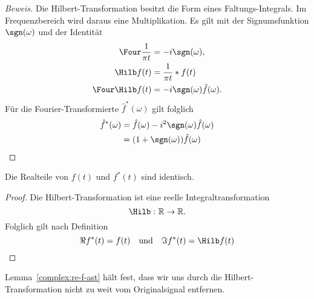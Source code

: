 \begin{proof}[Beweis]
	
	Die Hilbert-Transformation besitzt die Form eines Faltungs-Integrals.
	Im Frequenzbereich wird daraus eine Multiplikation.
	Es gilt mit der Signumsfunktion $\sgn(\omega)$ und der Identität
	\begin{align*}
		\Four \frac{1}{\pi t}  &= -i\sgn(\omega), \\
		\Hilb f(t) &= \frac{1}{\pi t} * f(t)\\
		\Four\Hilb f(t) &= -i\sgn(\omega) \hat{f}(\omega).
	\end{align*}
	Für die Fourier-Transformierte $\hat f^\ast(\omega)$ gilt folglich 
	\begin{align*}
		\hat{f}^\ast(\omega) 
		&= \hat{f}(\omega) - i^2\sgn(\omega)\hat{f}(\omega)\\
		&= (1 +\sgn(\omega))\hat{f}(\omega)\qedhere
	\end{align*}
\end{proof}

\begin{lemma}\label{complex:re-f-ast}
	Die Realteile von $f(t)$ und $f^\ast(t)$ sind identisch.
\end{lemma}

\begin{proof}
	Die Hilbert-Transformation ist eine reelle Integraltransformation
	\[\Hilb\,\colon\mathbb{R}\to\mathbb{R}.\]
	Folglich gilt nach Definition
	\[\Re f^\ast(t) = f(t) \quad \text{und}\quad \Im f^\ast(t) = \Hilb f(t)\qedhere\]
\end{proof}
Lemma~\ref{complex:re-f-ast} hält fest, dass wir uns durch die Hilbert-Transformation nicht zu weit vom Originalsignal entfernen.